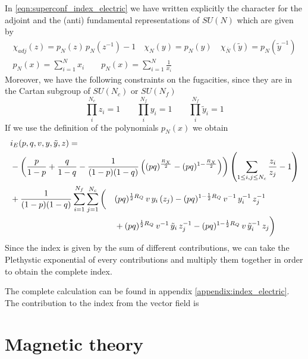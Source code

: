 In \eqref{eqn:superconf_index_electric} we have written explicitly the character for the adjoint and the (anti) fundamental representations of $SU(N)$ which are given by \
\begin{gather}
 \chi_{adj}(z) = p_{N}( z)\, p_{N}(z^{-1})-1 \quad \chi_{N}(y) = p_{N}(y) \quad \chi_{\overbar{N}}(\tilde{y}) = p_{N}(\tilde{y}^{-1}) \\
 p_{N}(x) = \sum_{i =1}^{N} x_i \qquad p_{N}(x) = \sum_{i =1}^{N} \frac{1}{x_i}
\end{gather}
Moreover, we have the following constraints on the fugacities, since they are in the Cartan subgroup of $SU(N_c)$ or $SU(N_f)$
\begin{equation}
\prod_i^{N_c} z_i = 1 \qquad \prod_i^{N_f} y_i = 1 \qquad \prod_i^{N_f} \tilde{y}_i = 1   
\end{equation}
If we use the definition of the polynomials $p_N(x)$ we obtain
\begin{equation}
\begin{aligned}
 & i_E (p,q,v, y,\tilde y ,z) = \\ 
 & 
  -\left({p \over 1-p}+{q \over 1-q} -{1 \over (1-p)(1-q)}
\left((p q)^{\frac{R_X}{2}}- (p q)^{1-\frac{R_X}{2}}\right)
\right) \left( \sum_{1\leq i,j \leq N_c} \frac{z_i}{z_j}-1\right ) \\ 
&
\begin{aligned}
&
+{1\over (1-p)(1-q)} \sum_{i=1}^{N_f} \sum_{j=1}^{N_c}
\bigg(
&&(p q)^{{1\over 2}R_Q} \, v \, y_i \, (z_j)
- (p q)^{1- {1\over 2} R_Q} \, v^{-1} \, y_i^{-1} \, z_j^{-1} \\
&
 && +
(p q)^{{1\over 2}R_Q}\, v^{-1}\, {\tilde y}_i \,z_j^{-1}
- (p q)^{1- {1\over 2}R_Q} \, v\, {\tilde y_i}^{-1}\, z_j\bigg) \\
\end{aligned}
\end{aligned}
\end{equation}
Since the index is given by the sum of different contributions, we can take the Plethystic exponential of every contributions and multiply them together in order to obtain the complete index. 



The complete calculation can be found in appendix \ref{appendix:index_electric}.\\
The contribution to the index from the vector field is
\begin{equation}

\end{equation}







\section{Magnetic theory}


